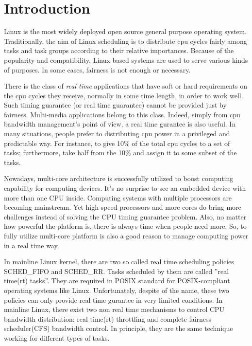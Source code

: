 \chapter{Introduction\label{chap:introduction}}

Linux is the most widely deployed open source general purpose
operating system. Traditionally, the aim of Linux scheduling is to
distribute cpu cycles fairly among tasks and task groups according to
their relative importances. Because of the popularity and
compatibility, Linux based systems are used to serve various kinds of
purposes. In some cases, fairness is not enough or necessary.

There is the class of \emph{real time} applications 
that have soft or hard requirements on the cpu cycles they receive,
normally in some time length, in order to work well. Such timing
guarantee (or real time guarantee) cannot be provided just by fairness. 
Multi-media applications belong to this class. Indeed, simply from cpu 
bandwidth management's point of view, a real time gurantee is also useful. 
In many situations, people prefer to distributing cpu power in a privileged 
and predictable way. For instance, to give 10\% of the total cpu cycles to a 
set of tasks; furthermore, take half from the 10\% and assign it to some 
subset of the tasks.

Nowadays, multi-core architecture is successfully utilized to boost 
computing capability for computing devices. It's no surprise to see an 
embedded device with more than one CPU inside. Computing systems with 
multiple processors are becoming mainstream. 
Yet high speed processors and more cores do bring more challenges instead of
solving the CPU timing guarantee problem. Also, no matter how powerful the 
platform is, there is always time when people need more. So, to fully utilize
multi-core platform is also a good reason to manage computing power in a 
real time way. 

In mainline Linux kernel, there are two so called real time scheduling 
policies SCHED\_FIFO and SCHED\_RR. Tasks scheduled by them are called 
''real time(rt) tasks''. They are required in POSIX standard for 
POSIX-compliant operating systems like Linux. Unfortunately, despite of 
the name, these two policies can only provide real time gurantee in very 
limited conditions. 
In mainline Linux, there exist two non real time mechanisms to control CPU 
bandwidth distribution: real time(rt) throttling and 
complete fairness scheduler(CFS) bandwidth control. 
In principle, they are the same technique working for different types of tasks.

